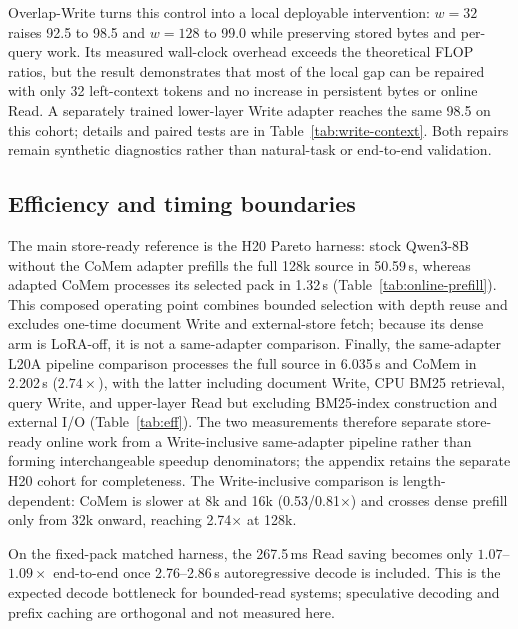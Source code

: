 Overlap-Write turns this control into a local deployable intervention:
$w{=}32$ raises 92.5 to 98.5 and $w{=}128$ to 99.0 while preserving stored
bytes and per-query work. Its measured wall-clock overhead exceeds the theoretical FLOP ratios, but the
result demonstrates that most of the local gap can be repaired with only 32
left-context tokens and no increase in persistent bytes or online Read. A
separately trained lower-layer Write adapter reaches the same 98.5 on this
cohort; details and paired tests are in Table~\ref{tab:write-context}. Both
repairs remain synthetic diagnostics rather than natural-task or end-to-end
validation.

\subsection{Efficiency and timing boundaries}
The main store-ready reference is the H20 Pareto harness: stock Qwen3-8B
without the CoMem adapter prefills the full 128k source in 50.59\,s, whereas
adapted CoMem processes its selected pack in 1.32\,s
(Table~\ref{tab:online-prefill}). This composed operating point combines bounded
selection with depth reuse and excludes one-time document Write and
external-store fetch; because its dense arm is LoRA-off, it is not a
same-adapter comparison. Finally, the same-adapter L20A pipeline comparison processes the full source in
6.035\,s and CoMem in 2.202\,s ($2.74\times$), with the latter including
document Write, CPU BM25 retrieval, query Write, and upper-layer Read but
excluding BM25-index construction and external I/O (Table~\ref{tab:eff}). The
two measurements therefore separate store-ready online work from a
Write-inclusive same-adapter pipeline rather than forming interchangeable
speedup denominators; the appendix retains the separate H20 cohort for
completeness.
The Write-inclusive comparison is length-dependent: CoMem is slower at 8k and
16k (0.53/0.81$\times$) and crosses dense prefill only from 32k onward, reaching
2.74$\times$ at 128k.

On the fixed-pack matched harness, the 267.5\,ms Read saving becomes only
$1.07$--$1.09\times$ end-to-end once 2.76--2.86\,s autoregressive decode is
included. This is the expected decode bottleneck for bounded-read systems;
speculative decoding and prefix caching are orthogonal and not measured here.
